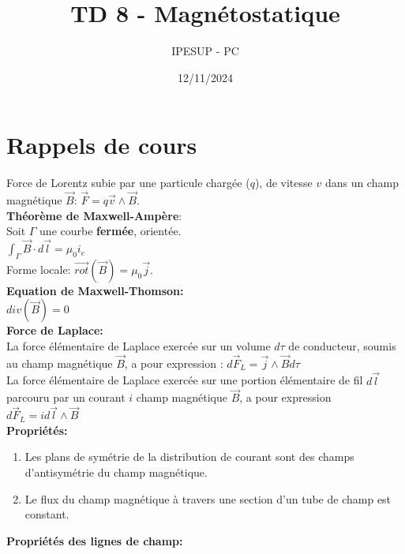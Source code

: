 \documentclass{article}
\title{TD 8 - Magnétostatique}
\author{IPESUP - PC }
\date{12/11/2024}
\begin{document}
\maketitle

\section{Rappels de cours}

Force de Lorentz subie par une particule chargée ($q$), de vitesse $v$ dans un champ magnétique $\vec{B}$: $\vec{F} = q \vec{v} \wedge \vec{B}$. \\


\textbf{Théorème de Maxwell-Ampère}: \\

Soit $\Gamma$ une courbe \textbf{fermée}, orientée. \\

$ \int_\Gamma \vec{B} \cdot  d \vec{l} = \mu_0 i_e$\\


Forme locale: $\vec{rot}(\vec{B}) = \mu_0 \vec{j}$. \\[0.2cm]

\textbf{Equation de Maxwell-Thomson:  }\\

${div}(\vec{B}) = 0$ \\[0.2cm]


\textbf{Force de Laplace:}\\
La force élémentaire de Laplace exercée sur un volume $d \tau$ de conducteur, soumis au champ magnétique $\vec{B}$, a pour expression : $d\vec{F}_L = \vec{j} \wedge \vec{B} d\tau$ \\

La force élémentaire de Laplace exercée sur une portion élémentaire de fil $d\vec{l}$ parcouru par un courant $i$ champ magnétique $\vec{B}$, a pour expression $d\vec{F}_L = i d \vec{l} \wedge \vec{B}$  \\[0.2cm]

\textbf{Propriétés: }
\begin{enumerate}
  \item Les plans de symétrie de la distribution de courant sont des champs d'antisymétrie du champ magnétique. 
  \item Le flux du champ magnétique à travers une section d'un tube de champ est constant.\\[0.2cm]
\end{enumerate}


\textbf{Propriétés des lignes de champ: }
\end{document}
